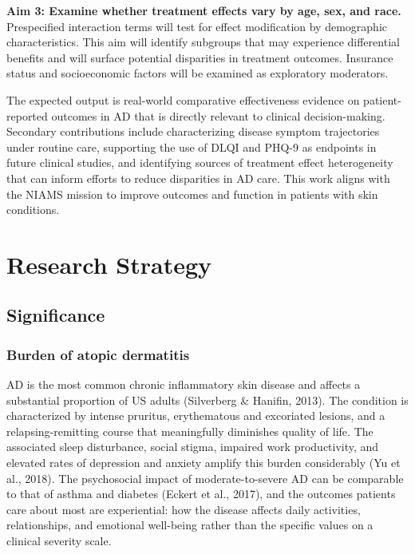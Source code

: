 \documentclass[
]{agujournal2019}
\begin{document}
\textbf{Aim 3: Examine whether treatment effects vary by age, sex, and
race.} Prespecified interaction terms will test for effect modification
by demographic characteristics. This aim will identify subgroups that
may experience differential benefits and will surface potential
disparities in treatment outcomes. Insurance status and socioeconomic
factors will be examined as exploratory moderators.

The expected output is real-world comparative effectiveness evidence on
patient-reported outcomes in AD that is directly relevant to clinical
decision-making. Secondary contributions include characterizing disease
symptom trajectories under routine care, supporting the use of DLQI and
PHQ-9 as endpoints in future clinical studies, and identifying sources
of treatment effect heterogeneity that can inform efforts to reduce
disparities in AD care. This work aligns with the NIAMS mission to
improve outcomes and function in patients with skin conditions.

\newpage{}

\section{Research Strategy}\label{research-strategy}

\subsection{Significance}\label{significance}

\subsubsection{Burden of atopic
dermatitis}\label{burden-of-atopic-dermatitis}

AD is the most common chronic inflammatory skin disease and affects a
substantial proportion of US adults (Silverberg \& Hanifin, 2013). The
condition is characterized by intense pruritus, erythematous and
excoriated lesions, and a relapsing-remitting course that meaningfully
diminishes quality of life. The associated sleep disturbance, social
stigma, impaired work productivity, and elevated rates of depression and
anxiety amplify this burden considerably (Yu et al., 2018). The
psychosocial impact of moderate-to-severe AD can be comparable to that
of asthma and diabetes (Eckert et al., 2017), and the outcomes patients
care about most are experiential: how the disease affects daily
activities, relationships, and emotional well-being rather than the
specific values on a clinical severity scale.
\end{document}
